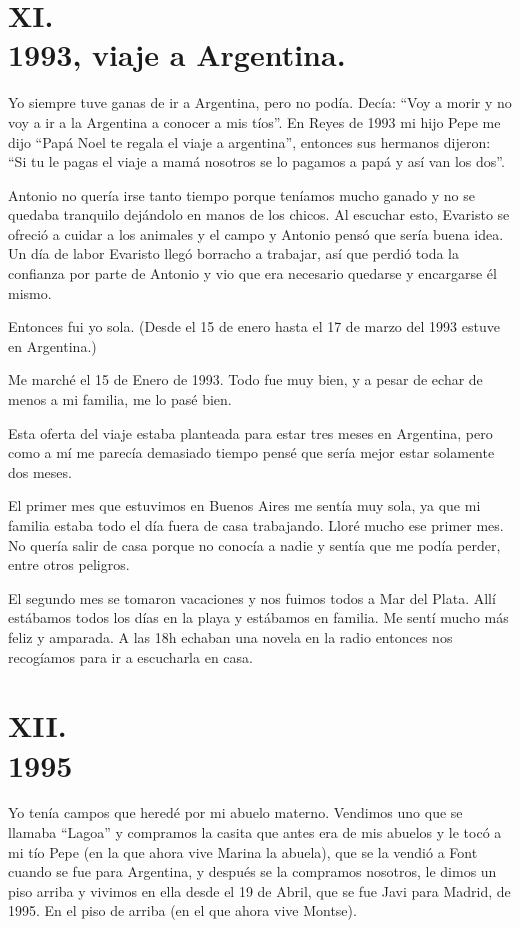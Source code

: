 \documentclass[12pt,a5paper]{book}
\begin{document}
\section*{XI.\\1993, viaje a Argentina.}

Yo siempre tuve ganas de ir a Argentina, pero no podía. Decía: “Voy a morir y no voy a ir a la Argentina a conocer a mis tíos”. 
En Reyes de 1993 mi hijo Pepe me dijo “Papá Noel te regala el viaje a argentina”, entonces sus hermanos dijeron: “Si tu le pagas el viaje a mamá nosotros se lo pagamos a papá y así van los dos”. 

Antonio no quería irse tanto tiempo porque teníamos mucho ganado y no se quedaba tranquilo dejándolo en manos de los chicos. Al escuchar esto, Evaristo se ofreció a cuidar a los animales y el campo y Antonio pensó que sería buena idea. Un día de labor Evaristo llegó borracho a trabajar, así que perdió toda la confianza por parte de Antonio y vio que era necesario quedarse y encargarse él mismo.

Entonces fui yo sola. (Desde el 15 de enero hasta el 17 de marzo del 1993 estuve en Argentina.)

Me marché el 15 de Enero  de 1993. Todo fue muy bien, y a pesar de echar de menos a mi familia, me lo pasé bien.
 
Esta oferta del viaje estaba planteada para estar tres meses en Argentina, pero como a mí me parecía demasiado tiempo pensé que sería mejor estar solamente dos meses.

El primer mes que estuvimos en Buenos Aires me sentía muy sola, ya que mi familia estaba todo el día fuera de casa trabajando. Lloré mucho ese primer mes. No quería salir de casa porque no conocía a nadie y sentía que me podía perder, entre otros peligros.

El segundo mes se tomaron vacaciones y nos fuimos todos a Mar del Plata. Allí estábamos todos los días en la playa y estábamos en familia. Me sentí mucho más feliz y amparada. A las 18h echaban una novela en la radio entonces nos recogíamos para ir a escucharla en casa.



\section*{XII.\\1995}

Yo tenía campos que heredé por mi abuelo materno. Vendimos uno que se llamaba “Lagoa” y compramos la casita que antes era de mis abuelos y le tocó a mi tío Pepe (en la que ahora vive Marina la abuela), que se la vendió a Font cuando se fue para Argentina, y después se la compramos nosotros, le dimos un piso arriba y vivimos en ella desde el 19 de Abril, que se fue Javi para Madrid, de 1995. En el piso de arriba (en el que ahora vive Montse).
\end{document}

